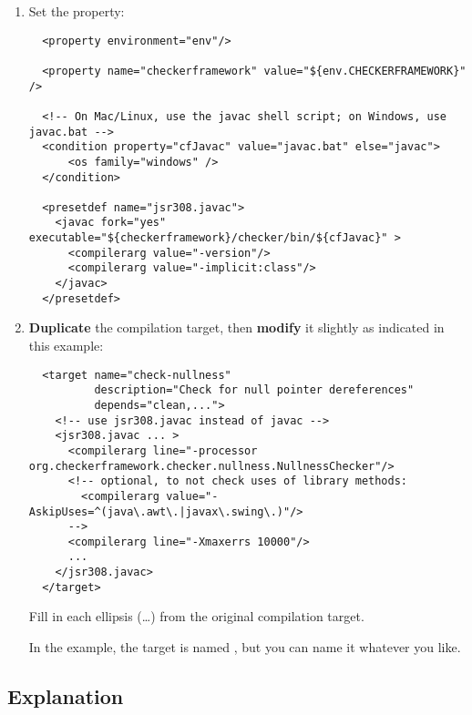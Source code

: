 \begin{enumerate}
\item
Set the  property:

\begin{smaller}
\begin{Verbatim}
  <property environment="env"/>

  <property name="checkerframework" value="${env.CHECKERFRAMEWORK}" />

  <!-- On Mac/Linux, use the javac shell script; on Windows, use javac.bat -->
  <condition property="cfJavac" value="javac.bat" else="javac">
      <os family="windows" />
  </condition>

  <presetdef name="jsr308.javac">
    <javac fork="yes" executable="${checkerframework}/checker/bin/${cfJavac}" >
      <compilerarg value="-version"/>
      <compilerarg value="-implicit:class"/>
    </javac>
  </presetdef>
\end{Verbatim}
\end{smaller}

\item \textbf{Duplicate} the compilation target, then \textbf{modify} it slightly as
indicated in this example:

\begin{smaller}
\begin{Verbatim}
  <target name="check-nullness"
          description="Check for null pointer dereferences"
          depends="clean,...">
    <!-- use jsr308.javac instead of javac -->
    <jsr308.javac ... >
      <compilerarg line="-processor org.checkerframework.checker.nullness.NullnessChecker"/>
      <!-- optional, to not check uses of library methods:
        <compilerarg value="-AskipUses=^(java\.awt\.|javax\.swing\.)"/>
      -->
      <compilerarg line="-Xmaxerrs 10000"/>
      ...
    </jsr308.javac>
  </target>
\end{Verbatim}
\end{smaller}

Fill in each ellipsis (\ldots) from the original compilation target.

In the example, the target is named , but you can
name it whatever you like.
\end{enumerate}

\subsection{Explanation\label{ant-task-explanation}}

